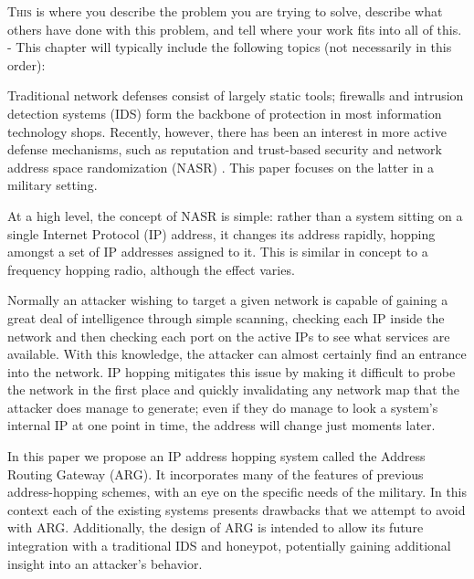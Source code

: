 \lettrine{T}{his} is where you describe the problem you are trying to solve, describe what others
have done with this problem, and tell where your work fits into all of this.
- This chapter will typically include the following topics (not necessarily in this order):

\par Traditional network defenses consist of largely static tools; firewalls and intrusion detection systems (IDS) form the backbone of protection in most information technology shops.  Recently, however, there has been an interest in more active defense mechanisms, such as reputation and trust-based security \cite{Untrustworthiness} and network address space randomization (NASR) \cite{APOD, NAH}. This paper focuses on the latter in a military setting.

\par At a high level, the concept of NASR is simple: rather than a system sitting on a single Internet Protocol (IP) address, it changes its address rapidly, hopping amongst a set of IP addresses assigned to it. This is similar in concept to a frequency hopping radio, although the effect varies. 

\par Normally an attacker wishing to target a given network is capable of gaining a great deal of intelligence through simple scanning, checking each IP inside the network and then checking each port on the active IPs to see what services are available. With this knowledge, the attacker can almost certainly find an entrance into the network. IP hopping mitigates this issue by making it difficult to probe the network in the first place and quickly invalidating any network map that the attacker does manage to generate; even if they do manage to look a system's internal IP at one point in time, the address will change just moments later.

\par In this paper we propose an IP address hopping system called the Address Routing Gateway (ARG). It incorporates many of the features of previous address-hopping schemes, with an eye on the specific needs of the military. In this context each of the existing systems presents drawbacks that we attempt to avoid with ARG. Additionally, the design of ARG is intended to allow its future integration with a traditional IDS and honeypot, potentially gaining additional insight into an attacker's behavior.

